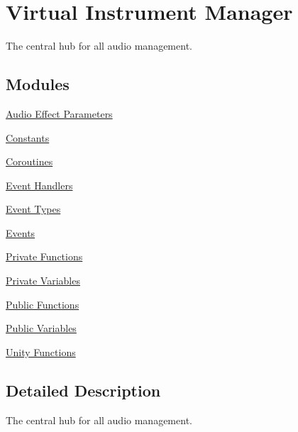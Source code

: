 \hypertarget{group___v_i_m}{}\section{Virtual Instrument Manager}
\label{group___v_i_m}


The central hub for all audio management.  


\subsection*{Modules}
\begin{DoxyCompactItemize}
\item 
\hyperlink{group__filter_params}{Audio Effect Parameters}
\item 
\hyperlink{group___v_i_m_const}{Constants}
\item 
\hyperlink{group___v_i_m_coroutines}{Coroutines}
\item 
\hyperlink{group___v_i_m_handlers}{Event Handlers}
\item 
\hyperlink{group___v_i_m_event_types}{Event Types}
\item 
\hyperlink{group___v_i_m_events}{Events}
\item 
\hyperlink{group___v_i_m_priv_func}{Private Functions}
\item 
\hyperlink{group___v_i_m_priv}{Private Variables}
\item 
\hyperlink{group___v_i_m_pub_func}{Public Functions}
\item 
\hyperlink{group___v_i_m_pub}{Public Variables}
\item 
\hyperlink{group___v_i_m_unity}{Unity Functions}
\end{DoxyCompactItemize}


\subsection{Detailed Description}
The central hub for all audio management. 

